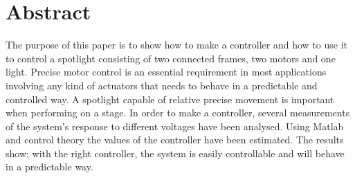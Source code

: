 \section{Abstract}

The purpose of this paper is to show how to make a controller and how to use it to control a spotlight consisting of two connected frames, two motors and one light. Precise motor control is an essential requirement in most applications involving any kind of actuators that needs to behave in a predictable and controlled way. A spotlight capable of relative precise movement is important when performing on a stage. In order to make a controller, several measurements of the system's response to different voltages have been analysed. Using Matlab and control theory the values of the controller have been estimated. The results show; with the right controller, the system is easily controllable and will behave in a predictable way.\\